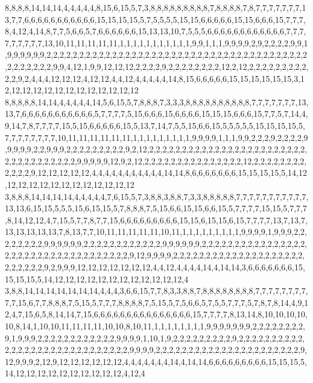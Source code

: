 8,8,8,8,14,14,14,4,4,4,4,4,8,15,6,15,5,7,3,8,8,8,8,8,8,8,8,8,7,8,8,8,8,7,8,7,7,7,7,7,7,7,13,7,7,6,6,6,6,6,6,6,6,6,6,6,15,15,15,15,5,7,5,5,5,5,15,15,6,6,6,6,6,15,15,6,6,6,15,7,7,7,8,4,12,4,14,8,7,7,5,6,6,5,7,6,6,6,6,6,6,15,13,13,10,7,5,5,5,6,6,6,6,6,6,6,6,6,6,6,6,7,7,7,7,7,7,7,7,7,13,10,11,11,11,11,11,1,1,1,1,1,1,1,1,1,1,1,9,9,1,1,1,9,9,9,9,2,9,2,2,2,2,9,9,1,9,9,9,9,9,9,2,2,2,2,2,2,2,2,2,2,2,2,2,2,2,2,2,2,2,2,2,2,2,2,2,2,2,2,2,2,2,2,2,2,2,2,2,2,2,2,2,2,2,2,2,2,2,9,9,4,12,1,9,9,12,12,12,2,2,2,2,9,2,2,2,2,2,2,2,2,12,2,12,2,2,2,2,2,2,2,2,2,2,2,9,2,4,4,4,12,12,12,4,12,12,4,4,12,4,4,4,4,4,14,8,15,6,6,6,6,6,15,15,15,15,15,15,3,12,12,12,12,12,12,12,12,12,12,12,12,12
8,8,8,8,8,14,14,4,4,4,4,4,14,5,6,15,5,7,8,8,8,7,3,3,3,8,8,8,8,8,8,8,8,8,8,7,7,7,7,7,7,7,13,13,7,6,6,6,6,6,6,6,6,6,6,6,5,7,7,7,7,5,15,6,6,6,15,6,6,6,6,15,15,15,6,6,6,15,7,7,5,7,14,4,9,14,7,8,7,7,7,7,15,5,15,6,6,6,6,6,15,5,13,7,14,7,5,5,15,6,6,15,5,5,5,5,5,15,15,15,15,5,7,7,7,7,7,7,7,7,10,11,11,11,11,11,11,1,1,1,1,1,1,1,1,1,9,9,9,9,1,1,1,9,9,2,2,2,9,2,2,2,2,9,9,9,9,9,2,2,9,9,9,2,2,2,2,2,2,2,2,2,9,2,12,2,2,2,2,2,2,2,2,2,2,2,2,2,2,2,2,2,2,2,2,2,2,2,2,2,2,2,2,2,2,2,2,2,2,2,9,9,9,9,9,12,9,2,12,2,2,2,2,2,2,2,2,2,2,2,2,2,2,2,12,2,2,2,2,2,2,2,2,2,2,2,2,9,12,12,12,12,12,4,4,4,4,4,4,4,4,4,4,4,14,14,8,6,6,6,6,6,6,6,15,15,15,15,5,14,12,12,12,12,12,12,12,12,12,12,12,12,12
3,8,8,8,14,14,14,14,4,4,4,4,4,7,6,15,5,7,3,8,8,3,8,8,7,3,3,8,8,8,8,8,7,7,7,7,7,7,7,7,7,7,7,13,13,6,15,15,5,5,5,15,6,15,15,5,7,8,8,8,7,5,15,6,6,15,15,6,6,15,5,7,7,7,7,15,15,5,7,7,7,8,14,12,12,4,7,15,5,7,7,8,7,7,15,6,6,6,6,6,6,6,6,6,15,15,6,15,15,6,15,7,7,7,7,13,7,13,7,13,13,13,13,13,7,8,13,7,7,10,11,11,11,11,11,10,11,1,1,1,1,1,1,1,1,1,9,9,9,9,1,9,9,9,2,2,2,2,2,2,2,2,9,9,9,9,9,9,2,2,2,2,2,2,2,2,2,2,2,2,9,9,9,9,9,9,2,2,2,2,2,2,2,2,2,2,2,2,2,2,2,2,2,2,2,2,2,2,2,2,2,2,2,2,2,2,2,2,2,2,2,9,12,9,9,9,9,2,2,2,2,2,2,2,2,2,2,2,2,2,2,2,2,2,2,2,2,2,2,2,2,2,2,9,2,9,9,9,12,12,12,12,12,12,12,4,4,12,4,4,4,4,14,4,14,14,3,6,6,6,6,6,6,6,15,15,15,15,5,14,12,12,12,12,12,12,12,12,12,12,12,12,4
3,8,8,14,14,14,14,14,14,14,4,4,4,3,6,6,15,7,7,8,3,3,8,8,7,8,8,8,8,8,8,8,8,7,7,7,7,7,7,7,7,7,7,15,6,7,7,8,8,8,7,5,15,5,7,7,7,8,8,8,8,7,5,15,5,7,5,6,6,5,7,5,5,7,7,7,5,7,8,7,8,14,4,9,12,4,7,15,6,5,8,14,14,7,15,6,6,6,6,6,6,6,6,6,6,6,6,6,6,6,15,7,7,7,7,8,13,14,8,10,10,10,10,10,8,14,1,10,10,11,11,11,11,10,10,8,10,11,1,1,1,1,1,1,1,1,9,9,9,9,9,9,9,2,2,2,2,2,2,2,2,9,1,9,9,9,2,2,2,2,2,2,2,2,2,2,2,2,9,9,9,9,1,10,1,9,2,2,2,2,2,2,2,2,2,9,2,2,2,2,2,2,2,2,2,2,2,2,2,2,2,2,2,2,2,2,2,2,2,2,2,2,2,2,2,9,9,9,9,2,2,2,2,2,2,2,2,2,2,2,2,2,2,2,2,2,2,2,2,2,2,9,12,9,9,9,2,12,9,12,12,12,12,12,12,4,4,4,4,4,4,4,14,4,14,14,6,6,6,6,6,6,6,6,6,15,15,15,5,14,12,12,12,12,12,12,12,12,12,12,4,12,4

